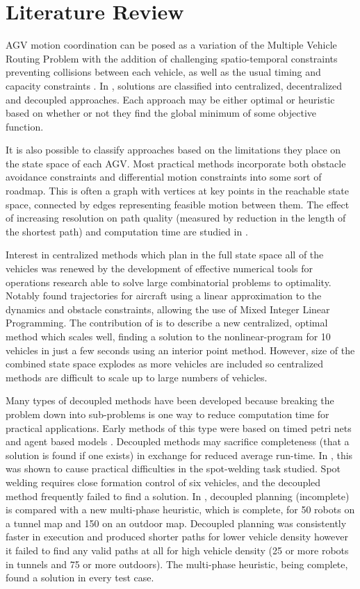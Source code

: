 \section{Literature Review}
AGV motion coordination can be posed as a variation of the Multiple Vehicle Routing Problem with the addition of challenging spatio-temporal constraints preventing collisions between each vehicle, as well as the usual timing and capacity constraints \cite{Miyamoto2016}. In \cite{Li2017}, solutions are classified into centralized, decentralized and decoupled approaches. Each approach may be either optimal or heuristic based on whether or not they find the global minimum of some objective function. 

It is also possible to classify approaches based on the limitations they place on the state space of each AGV. Most practical methods incorporate both obstacle avoidance constraints and differential motion constraints into some sort of roadmap. This is often a graph with vertices at key points in the reachable state space, connected by edges representing feasible motion between them. The effect of increasing resolution on path quality (measured by reduction in the length of the shortest path) and computation time are studied in \cite{VanDenBerg2005}. 

Interest in centralized methods which plan in the full state space all of the vehicles was renewed by the development of effective numerical tools for operations research able to solve large combinatorial problems to optimality. Notably \cite{Richards2002} found trajectories for aircraft using a linear approximation to the dynamics and obstacle constraints, allowing the use of Mixed Integer Linear Programming. The contribution of \cite{Li2017} is to describe a new centralized, optimal method which scales well, finding a solution to the nonlinear-program for 10 vehicles in just a few seconds using an interior point method. However, size of the combined state space explodes as more vehicles are included so centralized methods are difficult to scale up to large numbers of vehicles.

Many types of decoupled methods have been developed because breaking the problem down into sub-problems is one way to reduce computation time for practical applications. Early methods of this type were based on timed petri nets \cite{Dotoli2004} and agent based models \cite{Singh2002}. Decoupled methods may sacrifice completeness (that a solution is found if one exists) in exchange for reduced average run-time. In \cite{Sanchez2002}, this was shown to cause practical difficulties in the spot-welding task studied. Spot welding requires close formation control of six vehicles, and the decoupled method frequently failed to find a solution. In \cite{Peasgood2008}, decoupled planning (incomplete) is compared with a new multi-phase heuristic, which is complete, for 50 robots on a tunnel map and 150 on an outdoor map. Decoupled planning was consistently faster in execution and produced shorter paths for lower vehicle density however it failed to find any valid paths at all for high vehicle density (25 or more robots in tunnels and 75 or more outdoors). The multi-phase heuristic, being complete, found a solution in every test case. 

